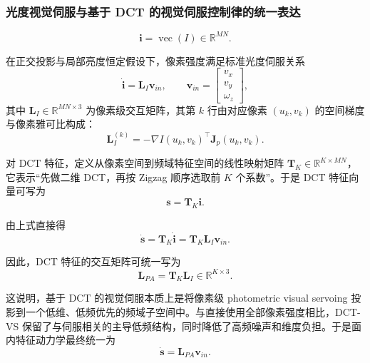 \documentclass{article}
\begin{document}
\subsubsection{光度视觉伺服与基于 DCT 的视觉伺服控制律的统一表达}
\label{comparative Formulation}
\begin{equation}
\mathbf{i} = \operatorname{vec}(I) \in \mathbb{R}^{MN}.
\end{equation}

在正交投影与局部亮度恒定假设下，像素强度满足标准光度伺服关系
\begin{equation}
\dot{\mathbf{i}} = \mathbf{L}_{I}\mathbf{v}_{in}, \qquad
\mathbf{v}_{in} =
\begin{bmatrix}
v_x \\ v_y \\ \omega_z
\end{bmatrix},
\end{equation}
其中 $\mathbf{L}_{I} \in \mathbb{R}^{MN\times 3}$ 为像素级交互矩阵，其第 $k$ 行由对应像素 $(u_k,v_k)$ 的空间梯度与像素雅可比构成：
\begin{equation}
\mathbf{L}_{I}^{(k)} = -\nabla I(u_k,v_k)^{\top}\mathbf{J}_{p}(u_k,v_k).
\end{equation}

对 DCT 特征，定义从像素空间到频域特征空间的线性映射矩阵 $\mathbf{T}_K \in \mathbb{R}^{K\times MN}$，它表示“先做二维 DCT，再按 Zigzag 顺序选取前 $K$ 个系数”。于是 DCT 特征向量可写为
\begin{equation}
\mathbf{s} = \mathbf{T}_K\mathbf{i}.
\end{equation}

由上式直接得
\begin{equation}
\dot{\mathbf{s}} = \mathbf{T}_K\dot{\mathbf{i}} = \mathbf{T}_K\mathbf{L}_{I}\mathbf{v}_{in}.
\end{equation}

因此，DCT 特征的交互矩阵可统一写为
\begin{equation}
\mathbf{L}_{PA} = \mathbf{T}_K\mathbf{L}_{I} \in \mathbb{R}^{K\times 3}.
\end{equation}

这说明，基于 DCT 的视觉伺服本质上是将像素级 photometric visual servoing 投影到一个低维、低频优先的频域子空间中。与直接使用全部像素强度相比，DCT-VS 保留了与伺服相关的主导低频结构，同时降低了高频噪声和维度负担。于是面内特征动力学最终统一为
\begin{equation}
\dot{\mathbf{s}} = \mathbf{L}_{PA}\mathbf{v}_{in}.
\end{equation}
\end{document}
